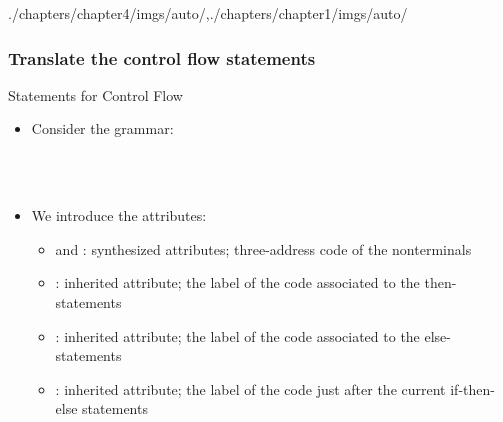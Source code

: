 \begin{graphicspathcontext}{{./chapters/chapter4/imgs/auto/},{./chapters/chapter1/imgs/auto/}}
\begin{bibunit}[apalike]
\subsubsection{Translate the control flow statements}
\subsubsectiontableofcontentslide

\begin{frame}[background=6]{Statements for Control Flow}
	\begin{itemize}
	\item Consider the grammar: \\
		\begin{footnotesize}\begin{minipage}{.5\linewidth}
		\begin{bnf}
		 \\
		 \\
		\end{bnf}
		\end{minipage}\end{footnotesize}
	\vspace{1cm}
	\item We introduce the attributes:
		\begin{itemize}
		\item {} and : synthesized attributes; three-address code of the nonterminals
		\item {}: inherited attribute; the label of the code associated to the then-statements
		\item {}: inherited attribute; the label of the code associated to the else-statements
		\item {}: inherited attribute; the label of the code just after the current if-then-else statements
		\end{itemize}
	\end{itemize}
\end{frame}


\end{bibunit}
\end{graphicspathcontext}
